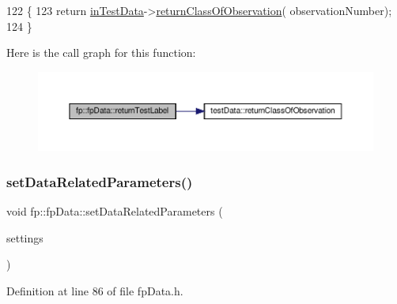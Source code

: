 \begin{DoxyCode}
122                                                              \{
123                 \textcolor{keywordflow}{return} \hyperlink{classfp_1_1fpData_ad4f4dd3a8d15633b7f983932fa60bbad}{inTestData}->\hyperlink{classtestData_a32ce8f625023ea9a9c0a7aff224c75cc}{returnClassOfObservation}(
      observationNumber);
124             \}
\end{DoxyCode}
Here is the call graph for this function\+:\nopagebreak
\begin{figure}[H]
\begin{center}
\leavevmode
\includegraphics[width=350pt]{classfp_1_1fpData_a50b6343c52560d1992de50e8cd6b1206_cgraph}
\end{center}
\end{figure}
\mbox{\label{classfp_1_1fpData_ab48923d57206e17b88f0d89833051b43}} 
\subsubsection{\texorpdfstring{set\+Data\+Related\+Parameters()}{setDataRelatedParameters()}}
{\footnotesize\ttfamily void fp\+::fp\+Data\+::set\+Data\+Related\+Parameters (\begin{DoxyParamCaption}\item[{\hyperlink{classfp_1_1fpInfo}{fp\+Info} \&}]{settings }\end{DoxyParamCaption})\hspace{0.3cm}{\ttfamily [inline]}}



Definition at line 86 of file fp\+Data.\+h.


